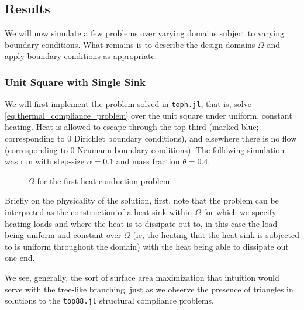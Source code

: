 \subsection{Results}

We will now simulate a few problems over varying domains subject to varying boundary conditions. What remains is to describe the design domains $\Omega$ and
apply boundary conditions as appropriate.

\subsubsection{Unit Square with Single Sink}\label{sec:thermal_compliance_classic_unit_square}

We will first implement the problem solved in \texttt{toph.jl},
that is, solve \autoref{eq:thermal_compliance_problem} over the unit square under uniform, constant heating.
Heat is allowed to escape through the top third (marked blue; corresponding to $0$ Dirichlet boundary conditions),
and elsewhere there is no flow (corresponding to $0$ Neumann boundary conditions).
The following simulation was run with step-size $\alpha = 0.1$ and mass fraction $\theta = 0.4$.
\begin{figure}[ht]
    \centering
    \caption[b]{$\Omega$ for the first heat conduction problem.}
\end{figure}
Briefly on the physicality of the solution, first, note that the problem can be interpreted as the construction
of a heat sink within $\Omega$ for which we specify heating loads and where the heat is to dissipate out to, in
this case the load being uniform and constant over $\Omega$ (ie, the heating that the heat sink is subjected to
is uniform throughout the domain) with the heat being able to dissipate out one end.

We see, generally, the sort of surface area maximization that intuition would serve with the tree-like branching,
just as we observe the presence of triangles in solutions to the \texttt{top88.jl} structural compliance problems.


